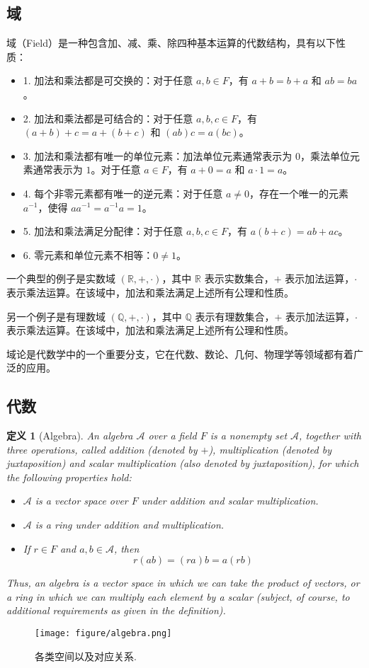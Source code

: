 \documentclass[UTF8,a4paper,11pt]{article}
\newtheorem{definition}{定义} %
\begin{document}
\subsection{域}
域（Field）是一种包含加、减、乘、除四种基本运算的代数结构，具有以下性质：
\begin{itemize}
\item 1. 加法和乘法都是可交换的：对于任意 $a,b \in F$，有 $a+b=b+a$ 和 $ab=ba$。
\item 2. 加法和乘法都是可结合的：对于任意 $a,b,c \in F$，有 $(a+b)+c=a+(b+c)$ 和 $(ab)c=a(bc)$。
\item 3. 加法和乘法都有唯一的单位元素：加法单位元素通常表示为 $0$，乘法单位元素通常表示为 $1$。对于任意 $a \in F$，有 $a+0=a$ 和 $a\cdot 1=a$。
\item 4. 每个非零元素都有唯一的逆元素：对于任意 $a \neq 0$，存在一个唯一的元素 $a^{-1}$，使得 $aa^{-1}=a^{-1}a=1$。
\item 5. 加法和乘法满足分配律：对于任意 $a,b,c \in F$，有 $a(b+c)=ab+ac$。
\item 6. 零元素和单位元素不相等：$0 \neq 1$。
\end{itemize}
一个典型的例子是实数域 $(\mathbb{R},+,\cdot)$，其中 $\mathbb{R}$ 表示实数集合，$+$ 表示加法运算，$\cdot$ 表示乘法运算。在该域中，加法和乘法满足上述所有公理和性质。

另一个例子是有理数域 $(\mathbb{Q},+,\cdot)$，其中 $\mathbb{Q}$ 表示有理数集合，$+$ 表示加法运算，$\cdot$ 表示乘法运算。在该域中，加法和乘法满足上述所有公理和性质。

域论是代数学中的一个重要分支，它在代数、数论、几何、物理学等领域都有着广泛的应用。

\subsection{代数}
\begin{definition}[Algebra]
An algebra $\mathcal{A}$ over a field $F$ is a nonempty set $\mathcal{A}$, together with three operations, called addition (denoted by $+$), multiplication (denoted by juxtaposition) and scalar multiplication (also denoted by juxtaposition), for which the following properties hold:
\begin{itemize}
\item $\mathcal{A}$ is a vector space over $F$ under addition and scalar multiplication.
\item $\mathcal{A}$ is a ring under addition and multiplication.
\item If $r\in F$ and $a,b\in \mathcal{A}$, then 
$$r(ab)=(ra)b=a(rb)$$
\end{itemize}
Thus, an algebra is a vector space in which we can take the product of vectors, or a ring in which we can multiply each element by a scalar (subject, of course, to additional requirements as given in the definition).
\end{definition}
\begin{figure}[htb!]
\centering
\texttt{[image: figure/algebra.png]}  
\caption{各类空间以及对应关系.}
\label{fig:space}
\end{figure}
\end{document}
